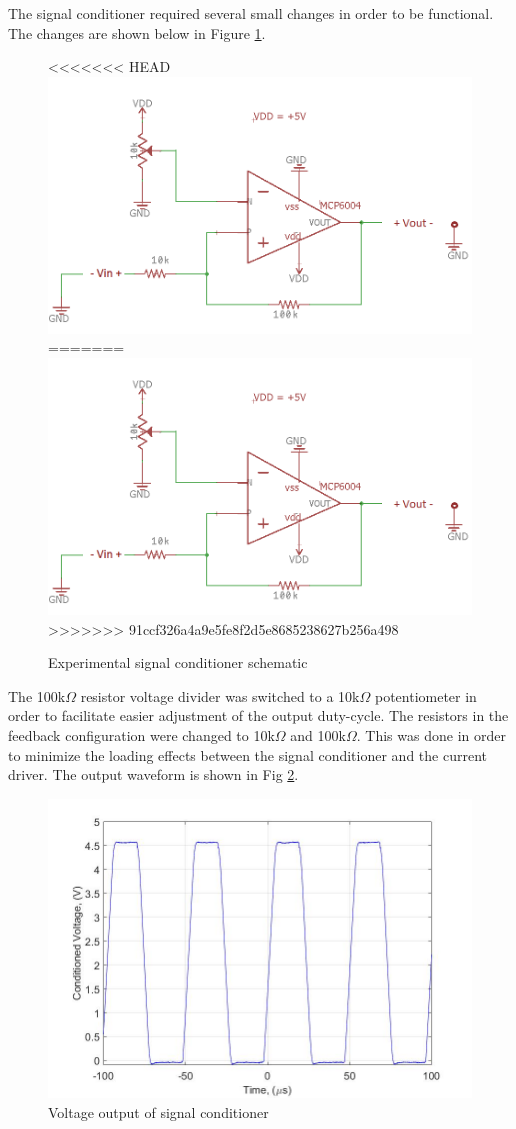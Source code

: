 
	
The signal conditioner required several small changes in order to be functional. The changes are shown below in Figure \ref{fig:signalconditionerexperimentalschem}.


\begin{figure}[H]
	\centering
<<<<<<< HEAD
	\includegraphics[width=0.7\linewidth]{ExperimentalImplementation/SignalConditionerExperimentalSchem}
=======
	\includegraphics[width=0.6\linewidth]{ExperimentalImplementation/SignalConditionerExperimentalSchem}
>>>>>>> 91ccf326a4a9e5fe8f2d5e8685238627b256a498
	\caption{Experimental signal conditioner schematic}
	\label{fig:signalconditionerexperimentalschem}
\end{figure}

 The 100k$\Omega$ resistor voltage divider was switched to a 10k$\Omega$ potentiometer in order to facilitate easier adjustment of the output duty-cycle. The resistors in the feedback configuration were changed to 10k$\Omega$ and 100k$\Omega$. This was done in order to minimize the loading effects between the signal conditioner and the current driver. The output waveform is shown in Fig \ref{fig:conditionedvoltagelab4}.

\begin{figure}[H]
	\centering
	\includegraphics[width=0.6\linewidth]{ExperimentalImplementation/conditioned_voltage_lab4}
	\caption[Experimental signal conditioner]{Voltage output of signal conditioner}
	\label{fig:conditionedvoltagelab4}
\end{figure}

